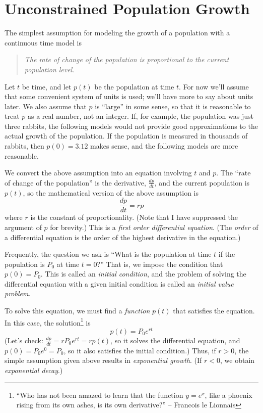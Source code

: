 \documentclass[reqno]{immbook}
\numberwithin{equation}{chapter}
\numberwithin{question}{section}
\numberwithin{theorem}{chapter}
\numberwithin{figure}{chapter}
\theoremstyle{definition}
\begin{document}
\section{Unconstrained Population Growth}
\label{sec:UnconstrPopGrowth}
% 
% 
The simplest assumption for modeling the growth of a population
with a continuous time model is
\begin{quote}
\emph{The rate of change of the population is proportional to the current population level.}
\end{quote} 
Let $t$ be time, and let $p(t)$ be the population at time $t$.
For now we'll assume that some convenient system of units is used;
we'll have more to say about units later.
We also assume that $p$ is ``large'' in some sense, so that it is reasonable
to treat $p$ as a real number, not an integer.
If, for example, the population was just three rabbits, the following
models would not provide good
approximations to the actual growth of the population.
If the population is measured in thousands of rabbits,
then $p(0)=3.12$ makes sense,
and the following models are more reasonable.

We convert the above assumption into an equation involving $t$
and $p$.
The ``rate of change of the population'' is the derivative, $\frac{dp}{dt}$, and the
current population is $p(t)$, so the mathematical version of the above
assumption is
\begin{equation}
  \frac{dp}{dt} = rp
\label{eqn:growth}
\end{equation}
where $r$ is the constant of proportionality.
(Note that I have suppressed the argument of $p$ for brevity.)
This is a \emph{first order differential equation}.
(The \emph{order} of a differential equation is the order of the
highest derivative in the equation.)

Frequently, the question we ask is ``What is the population at time $t$
if the population is $P_0$ at time $t=0$?''  That is, we impose the
condition that $p(0)=P_0$.  This is called an
\emph{initial condition}, and the problem of solving the differential
equation with a given initial condition is called an
\emph{initial value problem}.

To solve this equation, we must find a \emph{function} $p(t)$
that satisfies the equation.  In this case, the solution\footnote{%
``Who has not been amazed to learn that the function $y = e^x$, like a 
      phoenix rising from its own ashes, is its own derivative?'' 
       -- Francois le Lionnais
}
is
\begin{equation}
  p(t) = P_0 e^{rt}
\end{equation}
(Let's check:  $\frac{dp}{dt} = rP_0e^{rt} = r p(t)$, so  it solves the differential
equation, and $p(0) = P_0e^0 = P_0$, so it also satisfies the initial condition.)
Thus, if $r > 0$, the simple assumption given above results in
\emph{exponential growth}.
(If $r < 0$, we obtain \emph{exponential decay}.)
\end{document}
